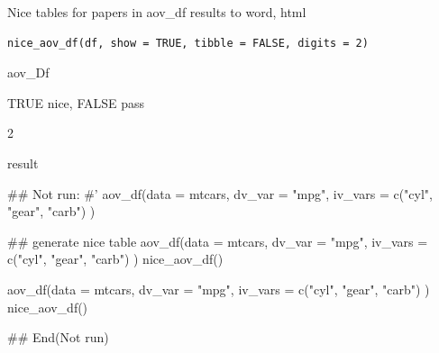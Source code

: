\documentclass[a4paper]{book}
\begin{document}
%
\begin{Description}
Nice tables for papers in aov\_df results  to  word, html
\end{Description}
%
\begin{Usage}
\begin{verbatim}
nice_aov_df(df, show = TRUE, tibble = FALSE, digits = 2)
\end{verbatim}
\end{Usage}
%
\begin{Arguments}
\begin{ldescription}
\item[\code{df}] aov\_Df

\item[\code{show}] TRUE nice, FALSE pass

\item[\code{digits}] 2
\end{ldescription}
\end{Arguments}
%
\begin{Value}
result
\end{Value}
%
\begin{Examples}
\begin{ExampleCode}

\#\# Not run: 
#'
aov_df(data = mtcars,
       dv_var = "mpg",
       iv_vars = c("cyl", "gear", "carb") )

## generate nice table
aov_df(data = mtcars,
       dv_var = "mpg",
       iv_vars = c("cyl", "gear", "carb") )%
  nice_aov_df()


aov_df(data = mtcars,
       dv_var = "mpg",
       iv_vars = c("cyl", "gear", "carb") )%
  nice_aov_df() %



## End(Not run)
\end{ExampleCode}
\end{Examples}
\end{document}
